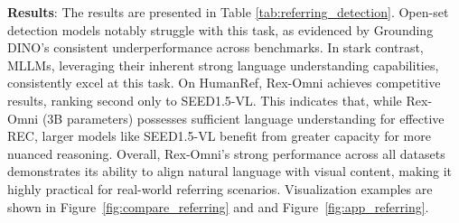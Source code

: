 \textbf{Results}: The results are presented in Table \ref{tab:referring_detection}. Open-set detection models notably struggle with this task, as evidenced by Grounding DINO’s consistent underperformance across benchmarks. In stark contrast, MLLMs, leveraging their inherent strong language understanding capabilities, consistently excel at this task. On HumanRef, Rex-Omni achieves competitive results, ranking second only to SEED1.5-VL. This indicates that, while Rex-Omni (3B parameters) possesses sufficient language understanding for effective REC, larger models like SEED1.5-VL benefit from greater capacity for more nuanced reasoning. Overall, Rex-Omni’s strong performance across all datasets demonstrates its ability to align natural language with visual content, making it highly practical for real-world referring scenarios. Visualization examples are shown in Figure~\ref{fig:compare_referring} and and Figure~\ref{fig:app_referring}.


% 



